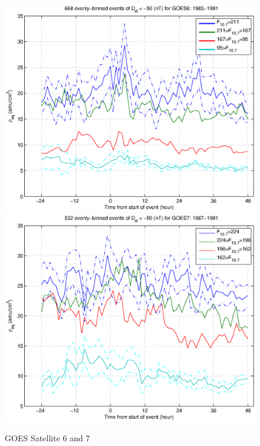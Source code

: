 \documentclass[10pt,twocolumn]{article}
\begin{document}
\begin{figure}[htp!]
\includegraphics[scale=0.45]{paperfigures/HighLowF107rhoeq-Dst50-GOES6-1983-1991.eps}
\includegraphics[scale=0.45]{paperfigures/HighLowF107rhoeq-Dst50-GOES7-1987-1991.eps}
\caption{GOES Satellite 6 and 7}
\end{figure}
\end{document}
